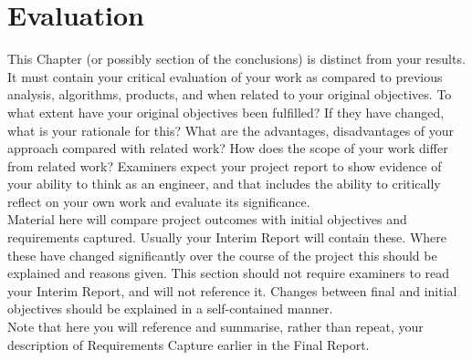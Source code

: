 \section{Evaluation}
This Chapter (or possibly section of the conclusions) is
distinct from your results. It must contain your critical
evaluation of your work as compared to previous
analysis, algorithms, products, and when related to
your original objectives. To what extent have your
original objectives been fulfilled? If they have
changed, what is your rationale for this? What are the
advantages, disadvantages of your approach
compared with related work? How does the scope of
your work differ from related work? Examiners expect
your project report to show evidence of your ability to
think as an engineer, and that includes the ability to
critically reflect on your own work and evaluate its
significance.\\ \newline \noindent Material here will compare project outcomes with
initial objectives and requirements captured. Usually
your Interim Report will contain these. Where these
have changed significantly over the course of the
project this should be explained and reasons given.
This section should not require examiners to read
your Interim Report, and will not reference it. Changes
between final and initial objectives should be
explained in a self-contained manner.\\ \newline \noindent Note that here you will reference and summarise,
rather than repeat, your description of Requirements
Capture earlier in the Final Report.

